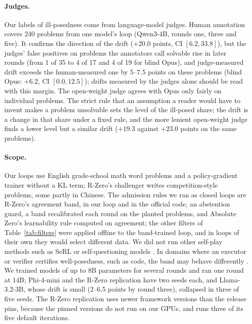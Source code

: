 \paragraph{Judges.} Our labels of ill-posedness come from language-model judges. Human annotation covers 240 problems from one model's loop (Qwen3-4B, rounds one, three and five). It confirms the direction of the drift ($+20.0$ points, CI $[6.2, 33.8]$), but the judges' false positives on problems the annotators call solvable rise in later rounds (from 1 of 35 to 4 of 17 and 4 of 19 for blind Opus), and judge-measured drift exceeds the human-measured one by 5--7.5 points on these problems (blind Opus: $+6.2$, CI $[0.0, 12.5]$); drifts measured by the judges alone should be read with this margin. The open-weight judge agrees with Opus only fairly on individual problems. The strict rule that an assumption a reader would have to invent makes a problem unsolvable sets the level of the ill-posed share; the drift is a change in that share under a fixed rule, and the more lenient open-weight judge finds a lower level but a similar drift ($+19.3$ against $+23.0$ points on the same problems).

\paragraph{Scope.} Our loops use English grade-school math word problems and a policy-gradient trainer without a KL term; R-Zero's challenger writes competition-style problems, some partly in Chinese. The admission rules we ran as closed loops are R-Zero's agreement band, in our loop and in the official code, an abstention guard, a band recalibrated each round on the planted problems, and Absolute Zero's learnability rule computed on agreement; the other filters of Table~\ref{tab:filters} were applied offline to the band-trained loop, and in loops of their own they would select different data. We did not run other self-play methods such as SeRL \citep{fang2025serl} or self-questioning models \citep{chen2025sqlm}. In domains where an executor or verifier certifies well-posedness, such as code, the band may behave differently \citep{pu2026survive}. We trained models of up to 8B parameters for several rounds and ran one round at 14B; Phi-4-mini and the R-Zero replication have two seeds each, and Llama-3.2-3B, whose drift is small (2--6.5 points by round three), collapsed in three of five seeds. The R-Zero replication uses newer framework versions than the release pins, because the pinned versions do not run on our GPUs, and runs three of its five default iterations.

